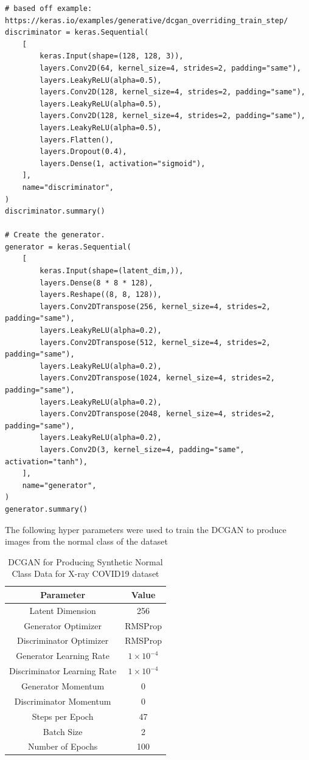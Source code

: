 \begin{verbatim}
# based off example: https://keras.io/examples/generative/dcgan_overriding_train_step/
discriminator = keras.Sequential(
    [
        keras.Input(shape=(128, 128, 3)),
        layers.Conv2D(64, kernel_size=4, strides=2, padding="same"),
        layers.LeakyReLU(alpha=0.5),
        layers.Conv2D(128, kernel_size=4, strides=2, padding="same"),
        layers.LeakyReLU(alpha=0.5),
        layers.Conv2D(128, kernel_size=4, strides=2, padding="same"),
        layers.LeakyReLU(alpha=0.5),
        layers.Flatten(),
        layers.Dropout(0.4),
        layers.Dense(1, activation="sigmoid"),
    ],
    name="discriminator",
)
discriminator.summary()

# Create the generator.
generator = keras.Sequential(
    [
        keras.Input(shape=(latent_dim,)),
        layers.Dense(8 * 8 * 128),
        layers.Reshape((8, 8, 128)),
        layers.Conv2DTranspose(256, kernel_size=4, strides=2, padding="same"),
        layers.LeakyReLU(alpha=0.2),
        layers.Conv2DTranspose(512, kernel_size=4, strides=2, padding="same"),
        layers.LeakyReLU(alpha=0.2),
        layers.Conv2DTranspose(1024, kernel_size=4, strides=2, padding="same"),
        layers.LeakyReLU(alpha=0.2),
        layers.Conv2DTranspose(2048, kernel_size=4, strides=2, padding="same"),
        layers.LeakyReLU(alpha=0.2),
        layers.Conv2D(3, kernel_size=4, padding="same", activation="tanh"),
    ],
    name="generator",
)
generator.summary()

\end{verbatim}
The following hyper parameters were used to train the DCGAN to produce images from the normal class of the dataset
\begin{table}[H]
    \centering
    \begin{tabular}{|c|c|}
    \hline
        Parameter
        & Value\\
         \hline
          Latent Dimension & 256\\
          Generator Optimizer & RMSProp \\
          Discriminator Optimizer & RMSProp\\
          Generator Learning Rate & $1\times10^{-4}$\\
          Discriminator Learning Rate & $1\times10^{-4}$\\
          Generator Momentum & 0\\
          Discriminator Momentum & 0\\
          Steps per Epoch & 47\\
          Batch Size & 2\\
          Number of Epochs & 100\\
         \hline
    \end{tabular}
    \caption{DCGAN for Producing Synthetic Normal Class Data for X-ray COVID19 dataset}
    \label{tab:DCGAN for Producing Synthetic Normal Class Data for X-ray COVID19 dataset}
\end{table}
